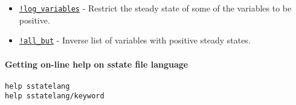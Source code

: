 \begin{itemize}
\itemsep1pt\parskip0pt
\item
  \href{sstatelang/logvariables}{\texttt{!log\_variables}} - Restrict
  the steady state of some of the variables to be positive.
\item
  \href{sstatelang/allbut}{\texttt{!all\_but}} - Inverse list of
  variables with positive steady states.
\end{itemize}

\paragraph{Getting on-line help on sstate file
language}

\begin{verbatim}
help sstatelang
help sstatelang/keyword
\end{verbatim}



